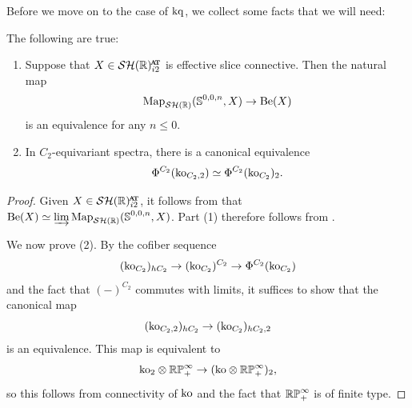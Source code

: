 Before we move on to the case of $\mathrm{kq}$, we collect some facts that we will need:
\begin{prop} \label{prop:completion-useful}
  The following are true:
  \begin{enumerate}
    \item Suppose that $X \in \SHRat$ is effective slice connective. Then the natural map
      \[\operatorname{\mathrm{Map}}_{\mathcal{SH}(\mathbb{R})} (\operatorname{\mathbb{S}}^{0,0,n}, X) \to \mathrm{Be} (X)\]
      is an equivalence for any $n \leq 0$.
    \item In $C_2$-equivariant spectra, there is a canonical equivalence
      \[\Phi^{C_2} (\mathrm{ko}_{C_2, 2}) \simeq \Phi^{C_2} (\mathrm{ko}_{C_2})_2.\]
  \end{enumerate}
\end{prop}

\begin{proof}
  Given $X \in \SHRat$, it follows from 
  that $\mathrm{Be}(X) \simeq \varinjlim \operatorname{\mathrm{Map}}_{\mathcal{SH}(\mathbb{R})} (\operatorname{\mathbb{S}}^{0,0,n}, X)$.
  Part (1) therefore follows from .
%

  We now prove (2). By the cofiber sequence
  \[(\mathrm{ko}_{C_2})_{hC_2} \to (\mathrm{ko}_{C_2})^{C_2} \to \Phi^{C_2} (\mathrm{ko}_{C_2})\]
  and the fact that $(-)^{C_2}$ commutes with limits, it suffices to show that the canonical map
  \[(\mathrm{ko}_{C_2,2})_{hC_2} \to (\mathrm{ko}_{C_2})_{hC_2, 2}\]
  is an equivalence.
  This map is equivalent to
  \[\mathrm{ko}_{2} \otimes \mathbb{RP}^{\infty}_{+} \to (\mathrm{ko} \otimes \mathbb{RP}^{\infty} _+ )_2, \]
  so this follows from connectivity of $\mathrm{ko}$ and the fact that $\mathbb{RP}^\infty _+$ is of finite type. 
%
\end{proof}

